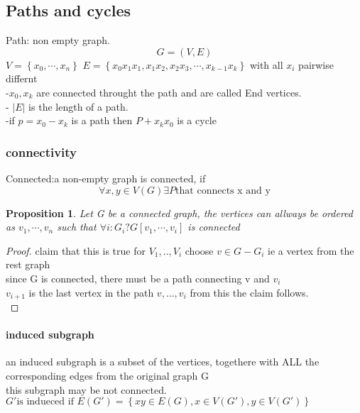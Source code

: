 \documentclass[a4paper]{article}
\newtheorem{proposition}[theorem]{Proposition}
\theoremstyle{definition}
\theoremstyle{remark}
\begin{document}
\subsection{Paths and cycles}
\label{sub:paths_and_cycles}

Path: non empty graph.\\
\begin{equation}
  G=(V,E)
\end{equation}
$V=\left\{ x_0,\cdots,x_n \right\}$
$E=\left\{ x_0x_1x_1,x_1x_2,x_2x_3,\cdots,x_{k-1}x_k \right\}$
with all $x_i$ pairwise differnt\\
-$x_0,x_k$ are connected throught the path and are called End vertices.\\

- $|E|$ is the length of a path.\\
-if $p=x_0-x_k$  is a path then $P+x_kx_0$ is a cycle\\
\subsubsection{connectivity}
\label{ssub:connectivity}

Connected:a non-empty graph is connected, if
\begin{equation}
  \forall x,y\in V(G)\exists P \textrm{that connects x and y}   
\end{equation}
\begin{proposition}
  Let G be a connected graph, the vertices can allways be ordered as $v_1,\cdots,v_n$ such that $\forall i:G_i?G[v_1,\cdots,v_i]$ is connected
\end{proposition}
\begin{proof}
  claim that this is true for $V_1,..,V_i$
  choose $v\in G - G_i$ ie a vertex from the rest graph\\
  since G is connected, there must be a path connecting v and $v_i$\\
  $ v_{i+1}$ is the last vertex in the path $v,\ldots,v_i$
  from this the claim follows.\\
\end{proof}
\paragraph{induced subgraph}
\label{par:induced_subgraph}
an induced subgraph is a subset of the vertices, togethere with ALL the corresponding edges from the original graph G\\
this subgraph may be not connected.
$ G' \textrm{is indueced if }E(G')=\left\{ xy\in E(G), x\in V(G'), y \in V(G') \right\}$
\end{document}
